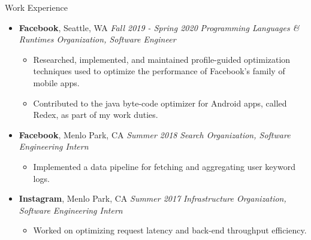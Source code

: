 \documentclass[10pt]{article}
\begin{document}
\begin{area}{Work Experience}
\begin{itemize}
    \item
        \textbf{Facebook}, Seattle, WA \hfill \emph{Fall 2019 - Spring 2020} \linebreak
        \emph{Programming Languages \& Runtimes Organization, Software Engineer}
        \begin{itemize}
            \item Researched, implemented, and maintained profile-guided optimization techniques used to optimize the performance of Facebook's family of mobile apps.
            \item Contributed to the java byte-code optimizer for Android apps, called Redex, as part of my work duties.
        \end{itemize}
    \item
        \textbf{Facebook}, Menlo Park, CA \hfill \emph{Summer 2018} \linebreak
        \emph{Search Organization, Software Engineering Intern}
        \begin{itemize}
            \item Implemented a data pipeline for fetching and aggregating user keyword logs.
        \end{itemize}
    \item
        \textbf{Instagram}, Menlo Park, CA \hfill \emph{Summer 2017} \linebreak
        \emph{Infrastructure Organization, Software Engineering Intern}
        \begin{itemize}
            \item Worked on optimizing request latency and back-end throughput efficiency.
        \end{itemize}
\end{itemize}
\end{area}
\end{document}
